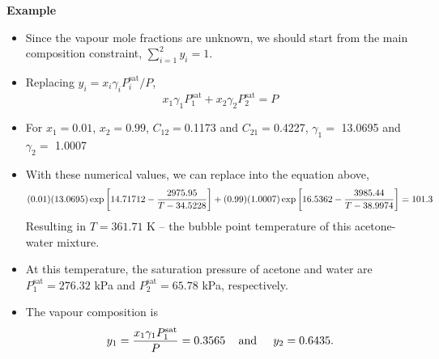 \begin{MyExample}{\begin{center}{\bf Example}\end{center}}
   \begin{itemize}
      \item Since the vapour mole fractions are unknown, we should start from the main composition constraint, $\sum\limits_{i=1}^{2}y_{i} = 1$.  
      \item Replacing $y_{i}=x_{i}\gamma_{i}P_{i}^{\text{sat}}/P$,
         \begin{displaymath}
            x_{1}\gamma_{1}P_{1}^{\text{sat}} + x_{2}\gamma_{2}P_{2}^{\text{sat}} = P
         \end{displaymath}
      \item For $x_{1} = 0.01$, $x_{2}=0.99$, $C_{12}=$0.1173 and $C_{21}=$0.4227, $\gamma_{1}=$ 13.0695 and $\gamma_{2}=$ 1.0007
      \item With these numerical values, we can replace into the equation above,
         \begin{displaymath}
            (0.01)(13.0695)\exp\left[14.71712 - \displaystyle\frac{2975.95}{T-34.5228}\right] + (0.99)(1.0007)\exp\left[16.5362 - \displaystyle\frac{3985.44}{T-38.9974}\right] =  101.3
         \end{displaymath}
         Resulting in  $T= 361.71$ K -- the bubble point temperature of this acetone-water mixture.
      \item At this temperature, the saturation pressure of acetone and water are $P_{1}^{\text{sat}}= 276.32$ kPa and $P_{2}^{\text{sat}} = 65.78$ kPa, respectively.
      \item The vapour composition is
         \begin{displaymath}
             y_{1} =\displaystyle\frac{x_{1}\gamma_{1}P_{1}^{\text{sat}}}{P} = 0.3565\;\;\;\text{ and }\;\;\;\; y_{2} = 0.6435.
         \end{displaymath} 
   \end{itemize}
   \end{MyExample} 

